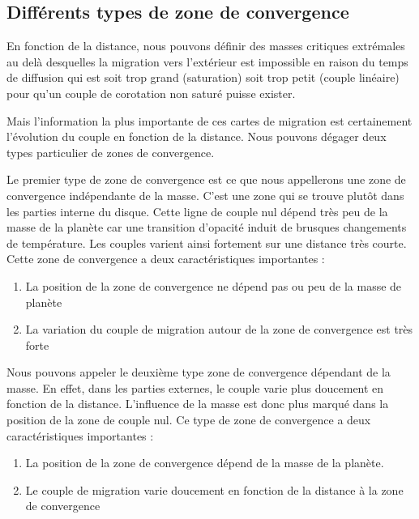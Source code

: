 \subsection{Différents types de zone de convergence}\label{sec:CZ-types}
En fonction de la distance, nous pouvons définir des masses critiques extrémales au delà desquelles la migration vers l'extérieur est impossible en raison du temps de diffusion qui est soit trop grand (saturation) soit trop petit (couple linéaire) pour qu'un couple de corotation non saturé puisse exister.

Mais l'information la plus importante de ces cartes de migration est certainement l'évolution du couple en fonction de la distance. Nous pouvons dégager deux types particulier de zones de convergence. 

Le premier type de zone de convergence est ce que nous appellerons une zone de convergence indépendante de la masse. C'est une zone qui se trouve plutôt dans les parties interne du disque. Cette ligne de couple nul dépend très peu de la masse de la planète car une transition d'opacité induit de brusques changements de température. Les couples varient ainsi fortement sur une distance très courte. Cette zone de convergence a deux caractéristiques importantes : 
\begin{enumerate}
\item La position de la zone de convergence ne dépend pas ou peu de la masse de planète
\item La variation du couple de migration autour de la zone de convergence est très forte
\end{enumerate}

Nous pouvons appeler le deuxième type \og zone de convergence dépendant de la masse\fg. En effet, dans les parties externes, le couple varie plus doucement en fonction de la distance. L'influence de la masse est donc plus marqué dans la position de la zone de couple nul. Ce type de zone de convergence a deux caractéristiques importantes : 
\begin{enumerate}
\item La position de la zone de convergence dépend de la masse de la planète. 
\item Le couple de migration varie doucement en fonction de la distance à la zone de convergence
\end{enumerate}

